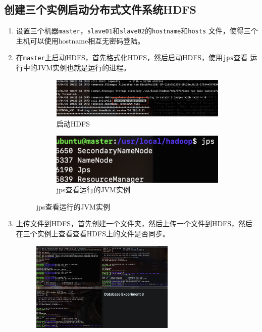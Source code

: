 \documentclass{article}
\begin{document}
\subsection{创建三个实例启动分布式文件系统HDFS}
\begin{enumerate}
    \item 设置三个机器\texttt{master}，\texttt{slave01}和\texttt{slave02}的\texttt{hostname}和\texttt{hosts}
    文件，使得三个主机可以使用hostname相互无密码登陆。
    \item 在\texttt{master}上启动HDFS，首先格式化HDFS，然后启动HDFS，使用\texttt{jps}查看
    运行中的JVM实例也就是运行的进程。
    \begin{figure}
        \begin{subfigure}{0.6\textwidth}
            \centering
            \includegraphics[width=\textwidth]{starthadoop.png}
            \caption*{启动HDFS}
        \end{subfigure}
        \hfill
        \begin{subfigure}{0.35\textwidth}
            \centering
            \includegraphics[width=\textwidth]{jps.png}
            \caption*{jps查看运行的JVM实例}
        \end{subfigure}
    \end{figure}
    \item 上传文件到HDFS，首先创建一个文件夹，然后上传一个文件到HDFS，然后在三个实例上查看查看HDFS上的文件是否同步。
    \begin{figure}[H]
        \centering
        \includegraphics[width=0.65\textwidth]{uploadfile.png}

\end{figure}
\end{enumerate}
\end{document}
